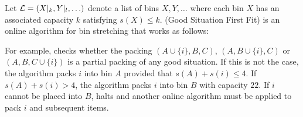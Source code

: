\begin{dfn}\label{dfn:gsff}
Let ${\mathcal L}=(X|_k, Y|_l, \ldots)$ denote a list of bins $X,Y, \ldots $ where each
bin $X$ has an associated capacity $k$ satisfying $s(X)\leq k$.
\GSFF{$\calL$} (Good Situation First Fit) is an online algorithm for bin stretching that works as follows:

\vspace{1.5ex}
\end{dfn}

For example,  checks whether
the packing $(A \cup \{i\},B,C)$, $(A,B \cup \{i\},C)$ or $(A,B,C \cup \{i\})$ is a partial packing of any good
situation. If this is not the case, the algorithm packs $i$ into bin
$A$ provided that $s(A)+s(i)\leq 4$. If $s(A) + s(i)>4$, the algorithm
packs $i$ into bin $B$ with capacity $22$. If $i$ cannot be placed
into $B$,  halts and another
online algorithm must be applied to pack $i$ and subsequent items.